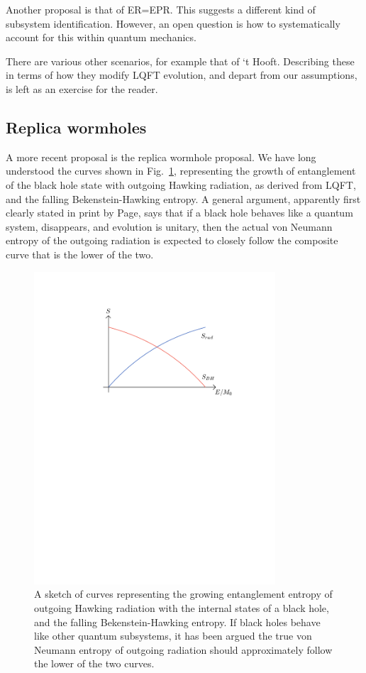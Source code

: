 \documentclass[11pt]{article}
\numberwithin{equation}{section}
\begin{document}
Another proposal is that of ER=EPR\cite{MaSu}.  This suggests a different kind of subsystem identification.  However, an open question is how to systematically account for this within quantum mechanics.

There are various other scenarios, for example that of `t Hooft\cite{thooft}.  Describing these in terms of how they modify LQFT evolution, and depart from our assumptions, is left as an exercise for the reader.



\subsection{Replica wormholes}

A more recent proposal is the replica wormhole proposal\cite{AEMM,AMMZ,PSSY,AHMST,AHMSTrev}.  We have long understood the curves shown in Fig.~\ref{Figent}, representing the growth of entanglement of the black hole state with outgoing Hawking radiation, as derived from LQFT, and the falling Bekenstein-Hawking entropy.  A general argument, apparently first clearly stated in print by Page\cite{Pageav,Pageinfo}, says that if a black hole behaves like a quantum system, disappears, and evolution is unitary, then the actual von Neumann entropy of the outgoing radiation is expected to closely follow the composite curve that is the lower of the two.

\begin{figure}[!hbtp] \begin{center}
\includegraphics[width=9cm]{Fig-entcurves.pdf}
\end{center}
\caption{A sketch of curves representing the growing entanglement entropy of outgoing Hawking radiation with the internal states of a black hole, and the falling Bekenstein-Hawking entropy.  If black holes behave like other quantum subsystems, it has been argued the true von Neumann entropy of outgoing radiation should approximately follow the lower of the two curves.}
\label{Figent}
\end{figure} 
\end{document}

